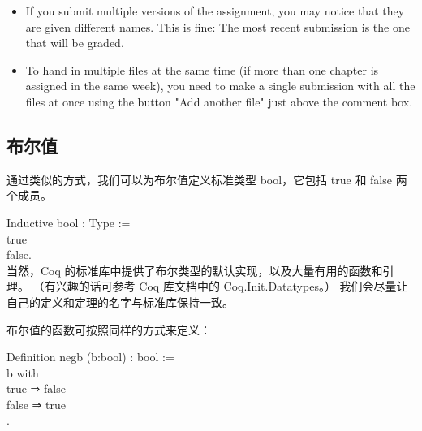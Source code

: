 \documentclass[utf8]{ctexart}
\providecommand{\tightlist}{%
  \setlength{\itemsep}{0pt}\setlength{\parskip}{0pt}}
\begin{document}
\begin{itemize}
\tightlist
\item
  If you submit multiple versions of the assignment, you may notice that
  they are given different names. This is fine: The most recent
  submission is the one that will be graded.
\item
  To hand in multiple files at the same time (if more than one chapter
  is assigned in the same week), you need to make a single submission
  with all the files at once using the button "Add another file" just
  above the comment box.
\end{itemize}

\protect\hypertarget{lab23}{}{}

\hypertarget{ux5e03ux5c14ux503c}{%
\subsection{布尔值}\label{ux5e03ux5c14ux503c}}

通过类似的方式，我们可以为布尔值定义标准类型 {{bool}}，它包括 {{true}}
和 {{false}} 两个成员。

{Inductive} {bool} : {Type} :=\\
\hspace*{0.333em}\hspace*{0.333em}\textbar{} {true}\\
\hspace*{0.333em}\hspace*{0.333em}\textbar{} {false}.\\

当然，Coq 的标准库中提供了布尔类型的默认实现，以及大量有用的函数和引理。
（有兴趣的话可参考 Coq 库文档中的 {{Coq.Init.Datatypes}}。）
我们会尽量让自己的定义和定理的名字与标准库保持一致。

布尔值的函数可按照同样的方式来定义：

{Definition} {negb} ({b}:{bool}) : {bool} :=\\
\hspace*{0.333em}\hspace*{0.333em}{match} {b} {with}\\
\hspace*{0.333em}\hspace*{0.333em}\textbar{} {true} ⇒ {false}\\
\hspace*{0.333em}\hspace*{0.333em}\textbar{} {false} ⇒ {true}\\
\hspace*{0.333em}\hspace*{0.333em}{end}.\\
\end{document}
